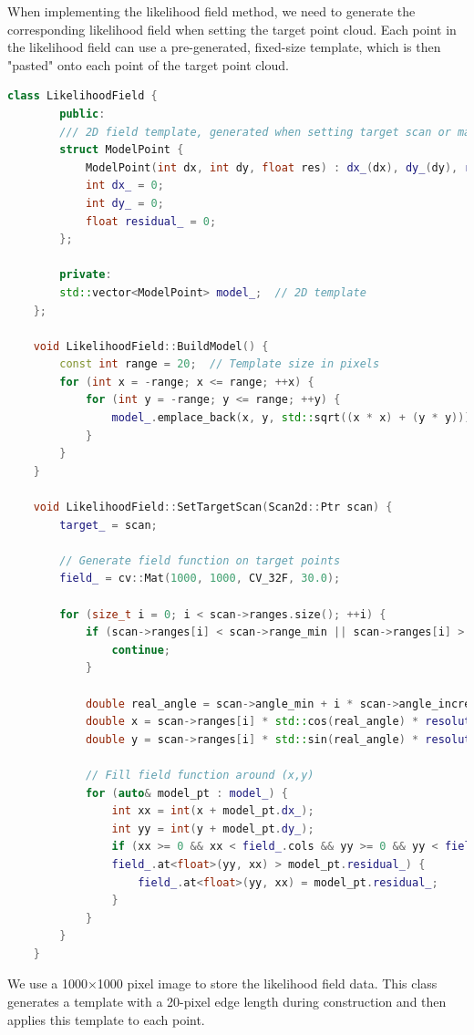 When implementing the likelihood field method, we need to generate the corresponding likelihood field when setting the target point cloud. Each point in the likelihood field can use a pre-generated, fixed-size template, which is then "pasted" onto each point of the target point cloud.  

\begin{lstlisting}[language=c++,caption=src/ch6/likelihood\_field.cc]  
	class LikelihoodField {  
		public:  
		/// 2D field template, generated when setting target scan or map  
		struct ModelPoint {  
			ModelPoint(int dx, int dy, float res) : dx_(dx), dy_(dy), residual_(res) {}  
			int dx_ = 0;  
			int dy_ = 0;  
			float residual_ = 0;  
		};  
		
		private:  
		std::vector<ModelPoint> model_;  // 2D template  
	};  
	
	void LikelihoodField::BuildModel() {  
		const int range = 20;  // Template size in pixels  
		for (int x = -range; x <= range; ++x) {  
			for (int y = -range; y <= range; ++y) {  
				model_.emplace_back(x, y, std::sqrt((x * x) + (y * y)));  
			}  
		}  
	}  
	
	void LikelihoodField::SetTargetScan(Scan2d::Ptr scan) {  
		target_ = scan;  
		
		// Generate field function on target points  
		field_ = cv::Mat(1000, 1000, CV_32F, 30.0);  
		
		for (size_t i = 0; i < scan->ranges.size(); ++i) {  
			if (scan->ranges[i] < scan->range_min || scan->ranges[i] > scan->range_max) {  
				continue;  
			}  
			
			double real_angle = scan->angle_min + i * scan->angle_increment;  
			double x = scan->ranges[i] * std::cos(real_angle) * resolution_ + 500;  
			double y = scan->ranges[i] * std::sin(real_angle) * resolution_ + 500;  
			
			// Fill field function around (x,y)  
			for (auto& model_pt : model_) {  
				int xx = int(x + model_pt.dx_);  
				int yy = int(y + model_pt.dy_);  
				if (xx >= 0 && xx < field_.cols && yy >= 0 && yy < field_.rows &&  
				field_.at<float>(yy, xx) > model_pt.residual_) {  
					field_.at<float>(yy, xx) = model_pt.residual_;  
				}  
			}  
		}  
	}  
\end{lstlisting}  

We use a 1000$\times$1000 pixel image to store the likelihood field data. This class generates a template with a 20-pixel edge length during construction and then applies this template to each point.  

